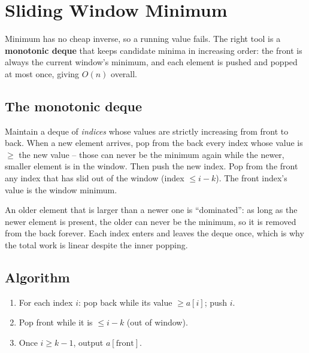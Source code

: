 \section{Sliding Window Minimum}
\label{sec:cses-sw-minimum}


\begin{patternbox}
Minimum has no cheap inverse, so a running value fails. The right tool is a
\textbf{monotonic deque} that keeps candidate minima in increasing order:
the front is always the current window's minimum, and each element is
pushed and popped at most once, giving $O(n)$ overall.
\end{patternbox}

\subsection*{The monotonic deque}

Maintain a deque of \emph{indices} whose values are strictly increasing
from front to back. When a new element arrives, pop from the back every
index whose value is $\ge$ the new value -- those can never be the minimum
again while the newer, smaller element is in the window. Then push the new
index. Pop from the front any index that has slid out of the window
(index $\le i-k$). The front index's value is the window minimum.

\begin{ideabox}
An older element that is larger than a newer one is ``dominated'': as long
as the newer element is present, the older can never be the minimum, so it
is removed from the back forever. Each index enters and leaves the deque
once, which is why the total work is linear despite the inner popping.
\end{ideabox}

\subsection*{Algorithm}

\begin{enumerate}
  \item For each index $i$: pop back while its value $\ge a[i]$; push $i$.
  \item Pop front while it is $\le i-k$ (out of window).
  \item Once $i\ge k-1$, output $a[\text{front}]$.
\end{enumerate}

